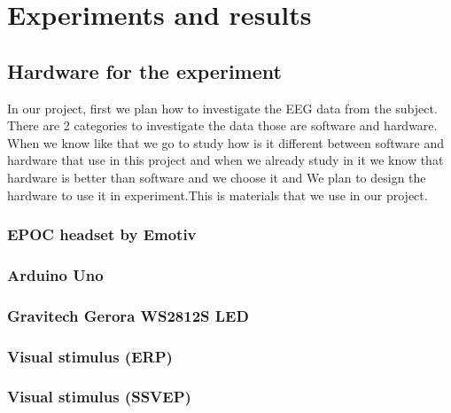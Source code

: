 \chapter{Experiments and results}

\label{ch:Experiments and results}

\setlength{\parindent}{4em}
\setlength{\parskip}{1em}
\renewcommand{\baselinestretch}{1.5}

\section{Hardware for the experiment}

In our project, first we plan how to investigate the EEG data from the subject. There are 2 categories to investigate the data those are software and hardware. When we know like that we go to study how is it different between software and hardware that use in this project and when we already study in it we know that hardware is better than software and we choose it and We plan to design the hardware to use it in experiment.This is materials that we use in our project.

\subsection{EPOC headset by Emotiv}

\subsection{Arduino Uno}

\subsection{Gravitech Gerora WS2812S LED}

\subsection{Visual stimulus (ERP)}

\subsection{Visual stimulus (SSVEP)}

